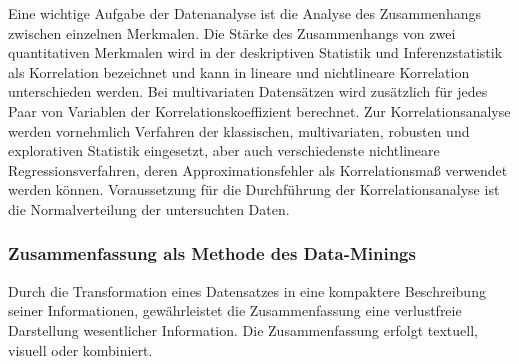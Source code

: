 Eine wichtige Aufgabe der Datenanalyse ist die Analyse des Zusammenhangs zwischen einzelnen Merkmalen. Die Stärke des Zusammenhangs von zwei quantitativen Merkmalen wird in der deskriptiven Statistik und Inferenzstatistik als Korrelation bezeichnet und kann in lineare und nichtlineare Korrelation unterschieden werden. Bei multivariaten Datensätzen wird zusätzlich für jedes Paar von Variablen der Korrelationskoeffizient berechnet.\cite{Goettingen} \glqq Zur Korrelationsanalyse werden vornehmlich Verfahren der klassischen, multivariaten, robusten und explorativen Statistik eingesetzt, aber auch verschiedenste nichtlineare Regressionsverfahren, deren Approximationsfehler als Korrelationsmaß verwendet werden können.\grqq \cite{Runkler.2015} Voraussetzung für die Durchführung der Korrelationsanalyse ist die Normalverteilung der untersuchten Daten.
	
\subsubsection{Zusammenfassung als Methode des Data-Minings}

Durch die Transformation eines Datensatzes in eine kompaktere Beschreibung seiner Informationen, gewährleistet die Zusammenfassung eine verlustfreie Darstellung wesentlicher Information. Die Zusammenfassung erfolgt textuell, visuell oder kombiniert.



